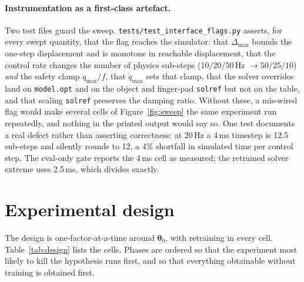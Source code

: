 \documentclass{article}
\newcommand{\dmax}{\Delta_{\max}}
\newcommand{\qdmax}{\dot q_{\max}}
\newcommand{\iface}{\boldsymbol{\theta}}
\begin{document}
\paragraph{Instrumentation as a first-class artefact.}
Two test files guard the sweep. \texttt{tests/test\_interface\_flags.py}
asserts, for every swept quantity, that the flag reaches the simulator: that
$\dmax$ bounds the one-step displacement and is monotone in reachable
displacement, that the control rate changes the number of physics sub-steps
($10/20/50$\,Hz $\to 50/25/10$) \emph{and} the safety clamp $\qdmax/f$, that
$\qdmax$ sets that clamp, that the solver overrides land on
\texttt{model.opt} and on the object and finger-pad \texttt{solref} but not on
the table, and that scaling \texttt{solref} preserves the damping ratio. Without
these, a mis-wired flag would make several cells of Figure~\ref{fig:sweep} the
same experiment run repeatedly, and nothing in the printed output would say so.
One test documents a real defect rather than asserting correctness: at 20\,Hz a
4\,ms timestep is 12.5 sub-steps and silently rounds to 12, a 4\% shortfall in
simulated time per control step. The eval-only gate reports the 4\,ms cell as
measured; the retrained solver extreme uses 2.5\,ms, which divides exactly.

\section{Experimental design}
\label{sec:design}

The design is one-factor-at-a-time around $\iface_0$, with retraining in every
cell. Table~\ref{tab:design} lists the cells. Phases are ordered so that the
experiment most likely to kill the hypothesis runs first, and so that
everything obtainable without training is obtained first.
\end{document}
